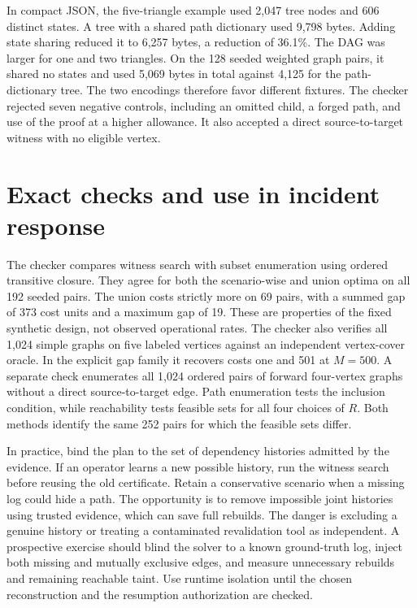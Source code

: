 \documentclass[11pt]{article}
\begin{document}
In compact JSON, the five-triangle example used 2,047 tree nodes
and 606 distinct states. A tree with a shared path dictionary
used 9,798 bytes. Adding state sharing reduced it to 6,257 bytes,
a reduction of 36.1\%. The DAG was larger for one and two
triangles. On the 128 seeded weighted graph pairs, it shared no
states and used 5,069 bytes in total against 4,125 for the
path-dictionary tree. The two encodings therefore favor different
fixtures. The checker rejected seven negative controls, including
an omitted child, a forged path, and use of the proof at a higher
allowance. It also accepted a direct source-to-target witness
with no eligible vertex.

\section{Exact checks and use in incident response}
The checker compares witness search with subset enumeration
using ordered transitive closure. They agree for both the
scenario-wise and union optima on all 192 seeded pairs. The
union costs strictly more on 69 pairs, with a summed gap of
373 cost units and a maximum gap of 19. These are properties
of the fixed synthetic design, not observed operational rates.
The checker also verifies all 1,024 simple graphs on five
labeled vertices against an independent vertex-cover oracle.
In the explicit gap family it recovers costs one and 501 at
$M=500$.
A separate check enumerates all 1,024 ordered pairs of forward
four-vertex graphs without a direct source-to-target edge.
Path enumeration tests the inclusion condition, while reachability
tests feasible sets for all four choices of $R$. Both methods
identify the same 252 pairs for which the feasible sets differ.

In practice, bind the plan to the set of dependency histories
admitted by the evidence. If an operator learns a new possible
history, run the witness search before reusing the old certificate.
Retain a conservative scenario when a missing log could hide
a path. The opportunity is to remove impossible joint histories
using trusted evidence, which can save full rebuilds. The danger
is excluding a genuine history or treating a contaminated
revalidation tool as independent. A prospective exercise should
blind the solver to a known ground-truth log, inject both missing
and mutually exclusive edges, and measure unnecessary rebuilds
and remaining reachable taint. Use runtime isolation until the
chosen reconstruction and the resumption authorization are checked.
\end{document}

